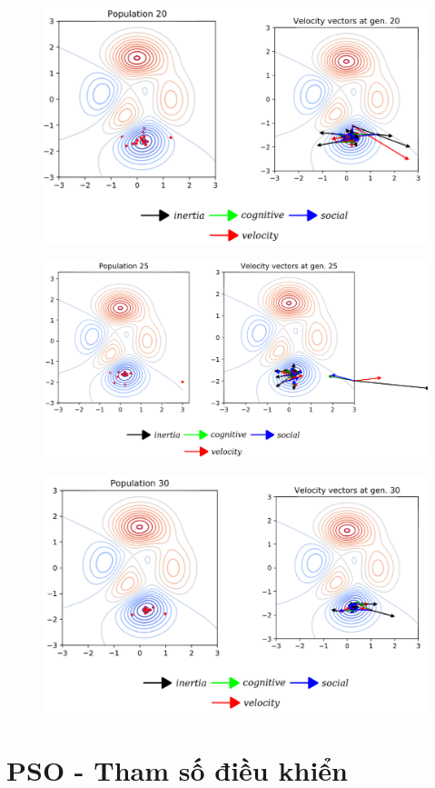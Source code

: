 \documentclass{book}
\begin{document}
\begin{figure}[H]
    \centering
    \includegraphics[width=0.75\linewidth]{images/GA-3_53.png}
\end{figure}

\begin{figure}[H]
    \centering
    \includegraphics[width=0.75\linewidth]{images/GA-3_54.png}
\end{figure}

\begin{figure}[H]
    \centering
    \includegraphics[width=0.75\linewidth]{images/GA-3_55.png}
\end{figure}

\section{PSO - Tham số điều khiển}
\end{document}
